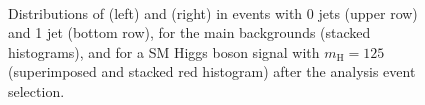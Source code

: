 \begin{figure}
\centering
{}
\\
\caption{Distributions of \MET (left) and \ptll (right) in events with 0 jets (upper row) and 1 jet (bottom row), for the main backgrounds (stacked histograms), and for a SM Higgs boson signal with $m_\mathrm{H}=125$\GeV (superimposed and stacked red histogram) after the analysis event selection.}\label{fig:distr3}
\end{figure}

